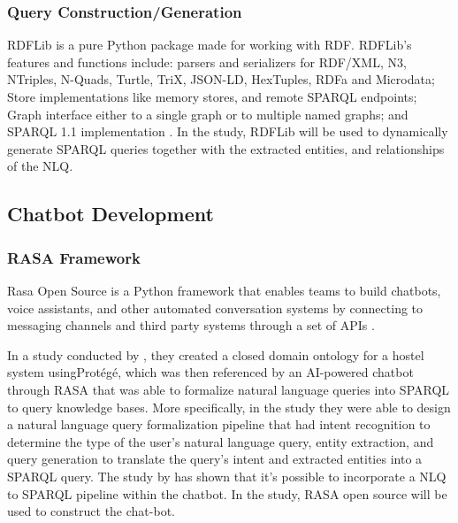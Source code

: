\subsubsection{Query Construction/Generation}
RDFLib is a pure Python package made for working with RDF. RDFLib’s features and functions include: parsers and serializers for RDF/XML, N3, NTriples, N-Quads, Turtle, TriX, JSON-LD, HexTuples, RDFa and Microdata; Store implementations like memory stores, and remote SPARQL endpoints; Graph interface either to a single graph or to multiple named graphs; and SPARQL 1.1 implementation \cite{unknown-author-no-date-rdflib}. In the study, RDFLib will be used to dynamically generate SPARQL queries together with the extracted entities, and relationships of the NLQ. 

\subsection{Chatbot Development}
\subsubsection{RASA Framework}

Rasa Open Source is a Python framework that enables teams to build chatbots, voice assistants, and other automated conversation systems by connecting to messaging channels and third party systems through a set of APIs \cite{unknown-author-2024-rasa}. 

In a study conducted by , they  created a closed domain ontology for a hostel system usingProtégé, which was then referenced by an AI-powered chatbot through RASA that was able to formalize natural language queries into SPARQL to query knowledge bases. More specifically, in the study they were able to design a natural language query formalization pipeline that had intent recognition to determine the type of the user’s natural language query, entity extraction, and query generation to translate the query’s intent and extracted entities into a SPARQL query.  The study by  has shown that it’s possible to incorporate a NLQ to SPARQL pipeline within the chatbot. In the study, RASA open source will be used to construct the chat-bot. 


